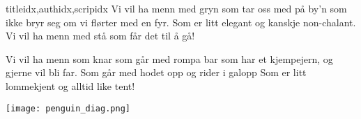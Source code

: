 \documentclass[14pt,letterpaper,norsk]{article}
\begin{document}
\begin{songs}{titleidx,authidx,scripidx}
\beginverse
Vi vil ha menn med gryn
som tar oss med på by'n
som ikke bryr seg om vi flørter med en fyr.
Som er litt elegant
og kanskje non-chalant.
Vi vil ha menn med stå som får det til å gå!
\endverse

\beginverse
Vi vil ha menn som knar
som går med rompa bar
som har et kjempejern, og gjerne vil bli far.
Som går med hodet opp
og rider i galopp
Som er litt lommekjent og alltid like tent!
\endverse
\endsong

\end{songs}

\newpage

\texttt{[image: penguin\_diag.png]}
\end{document}
